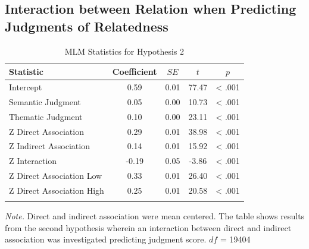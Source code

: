 \documentclass[english,,man]{apa6}
\begin{document}
\hypertarget{interaction-between-relation-when-predicting-judgments-of-relatedness}{%
\subsection{Interaction between Relation when Predicting Judgments of Relatedness}\label{interaction-between-relation-when-predicting-judgments-of-relatedness}}

\begin{table}[tbp]
\begin{center}
\begin{threeparttable}
\caption{\label{tab:hyp2-table}MLM Statistics for Hypothesis 2}
\begin{tabular}{lcccc}
\toprule
Statistic & \multicolumn{1}{c}{Coefficient} & \multicolumn{1}{c}{$SE$} & \multicolumn{1}{c}{$t$} & \multicolumn{1}{c}{$p$}\\
\midrule
Intercept & 0.59 & 0.01 & 77.47 & < .001\\
Semantic Judgment & 0.05 & 0.00 & 10.73 & < .001\\
Thematic Judgment & 0.10 & 0.00 & 23.11 & < .001\\
Z Direct Association & 0.29 & 0.01 & 38.98 & < .001\\
Z Indirect Association & 0.14 & 0.01 & 15.92 & < .001\\
Z Interaction & -0.19 & 0.05 & -3.86 & < .001\\
Z Direct Association Low & 0.33 & 0.01 & 26.40 & < .001\\
Z Direct Association High & 0.25 & 0.01 & 20.58 & < .001\\
\bottomrule
\addlinespace
\end{tabular}
\begin{tablenotes}[para]
\normalsize{\textit{Note.} Direct and indirect association were mean centered. The table shows results from the second hypothesis wherein an interaction between direct and indirect association was investigated predicting judgment score. $df$ = 19404}
\end{tablenotes}
\end{threeparttable}
\end{center}
\end{table}
\end{document}
